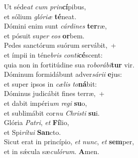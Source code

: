 \evenverse Ut séde\textit{at} \textit{cum} \textit{prin}\textbf{cí}pibus,~\*\\
\evenverse et sólium \textit{gló}\textit{ri}\textit{æ} \textbf{té}neat.\\
\oddverse Dómini enim sunt \textit{cár}\textit{di}\textit{nes} \textbf{ter}ræ,~\*\\
\oddverse et pósuit su\textit{per} \textit{e}\textit{os} \textbf{or}bem.\\
\evenverse Pedes sanctórum suórum servábit,~+\\
\evenverse  et ímpii in téne\textit{bris} \textit{con}\textit{ti}\textbf{cé}scent:~\*\\
\evenverse quia non in fortitúdine sua ro\textit{bo}\textit{rá}\textit{bi}\textbf{tur} vir.\\
\oddverse Dóminum formidábunt adver\textit{sá}\textit{ri}\textit{i} \textbf{e}jus:~\*\\
\oddverse et super ipsos in \textit{cæ}\textit{lis} \textit{to}\textbf{ná}bit:\\
\evenverse Dóminus judicábit fines terræ,~+\\
\evenverse  et dabit impéri\textit{um} \textit{re}\textit{gi} \textbf{su}o,~\*\\
\evenverse et sublimábit cor\textit{nu} \textit{Chri}\textit{sti} \textbf{su}i.\\
\oddverse Glória \textit{Pa}\textit{tri}, \textit{et} \textbf{Fí}lio,~\*\\
\oddverse et Spi\textit{rí}\textit{tu}\textit{i} \textbf{San}cto.\\
\evenverse Sicut erat in princípio, \textit{et} \textit{nunc}, \textit{et} \textbf{sem}per,~\*\\
\evenverse et in sǽcula sæ\textit{cu}\textit{ló}\textit{rum}. \textbf{A}men.\\
